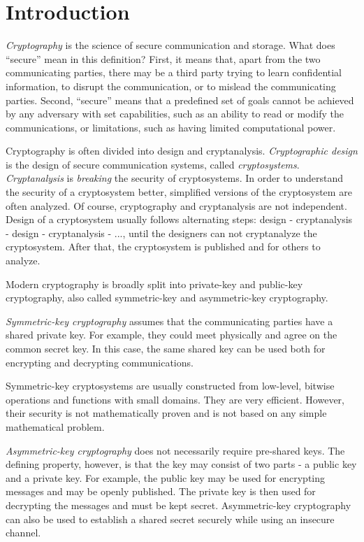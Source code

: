 \section{Introduction}

\emph{Cryptography} is the science of secure communication and storage. What does ``secure'' mean in this definition? First, it means that, apart from the two communicating parties, there may be a third party trying to learn confidential information, to disrupt the communication, or to mislead the communicating parties. Second, ``secure'' means that a predefined set of goals cannot be achieved by any adversary with set capabilities, such as an ability to read or modify the communications, or limitations, such as having limited computational power.

Cryptography is often divided into design and cryptanalysis. \emph{Cryptographic design} is the design of secure communication systems, called \emph{cryptosystems}. \emph{Cryptanalysis} is \emph{breaking} the security of cryptosystems. In order to understand the security of a cryptosystem better, simplified versions of the cryptosystem are often analyzed. Of course, cryptography and cryptanalysis are not independent. Design of a cryptosystem usually follows alternating steps: design - cryptanalysis - design - cryptanalysis - ..., until the designers can not cryptanalyze the cryptosystem. After that, the cryptosystem is published and for others to analyze. 

Modern cryptography is broadly split into private-key and public-key cryptography, also called symmetric-key and asymmetric-key cryptography.

\emph{Symmetric-key cryptography} assumes that the communicating parties have a shared private key. For example, they could meet physically and agree on the common secret key. In this case, the same shared key can be used both for encrypting and decrypting communications. 

Symmetric-key cryptosystems are usually constructed from low-level, bitwise operations and functions with small domains. They are very efficient. However, their security is not mathematically proven and is not based on any simple mathematical problem.

\emph{Asymmetric-key cryptography} does not necessarily require pre-shared keys. The defining property, however, is that the key may consist of two parts - a public key and a private key. For example, the public key may be used for encrypting messages and may be openly published. The private key is then used for decrypting the messages and must be kept secret.
Asymmetric-key cryptography can also be used to establish a shared secret securely while using an insecure channel.

